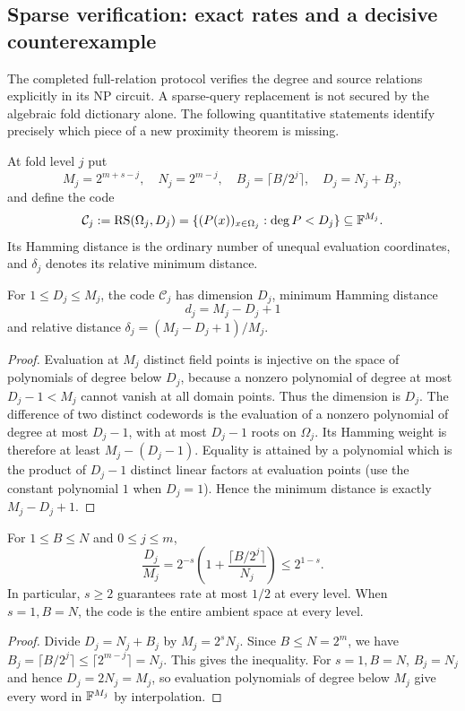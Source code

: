 \subsection{Sparse verification: exact rates and a decisive counterexample}\label{sec:security14:sparse}
The completed full-relation protocol verifies the
degree and source relations explicitly in its NP
circuit. A sparse-query replacement is not secured
by the algebraic fold dictionary alone. The
following quantitative statements identify precisely
which piece of a new proximity theorem is missing.

\begin{definition}\label{def:security14:codes}
At fold level $j$ put
\[
 M_j=2^{m+s-j},\quad
 N_j=2^{m-j},\quad
 B_j=\lceil B/2^j\rceil,\quad
 D_j=N_j+B_j,
\]
and define the code
\[
 \mathcal C_j:=
 \operatorname{RS}(\Omega_j,D_j)
 =\{(P(x))_{x\in\Omega_j}:
          \deg P<D_j\}
 \subseteq\mathbb{F}^{M_j}.
\]
Its Hamming distance is the
ordinary number of unequal
evaluation coordinates, and
$\delta_j$ denotes its
relative minimum distance.
\end{definition}

\begin{lemma}\label{lem:security14:rs-distance}
For $1\le D_j\le M_j$,
the code $\mathcal C_j$ has
dimension $D_j$, minimum
Hamming distance
\[
 \boxed{d_j=M_j-D_j+1}
\]
and relative distance
$\delta_j=(M_j-D_j+1)/M_j$.
\end{lemma}
\begin{proof}
Evaluation at $M_j$
distinct field points
is injective on the
space of polynomials of
degree below $D_j$,
because a nonzero polynomial
of degree at most
$D_j-1<M_j$ cannot vanish
at all domain points.
Thus the dimension is
$D_j$. The difference
of two distinct codewords
is the evaluation of a
nonzero polynomial of degree
at most $D_j-1$, with at most
$D_j-1$ roots on $\Omega_j$.
Its Hamming weight is
therefore at least
$M_j-(D_j-1)$.
Equality is attained by
a polynomial which is the
product of $D_j-1$ distinct
linear factors at evaluation
points (use the constant
polynomial $1$ when
$D_j=1$). Hence the
minimum distance is
exactly $M_j-D_j+1$.
\end{proof}

\begin{lemma}\label{lem:security14:rates}
For $1\le B\le N$ and
$0\le j\le m$,
\[
 \boxed{
 \frac{D_j}{M_j}
 =2^{-s}\left(
 1+\frac{\lceil B/2^j\rceil}{N_j}
 \right)\le2^{1-s}.}
\]
In particular, $s\ge2$
guarantees rate at most
$1/2$ at every level.
When $s=1,B=N$, the
code is the entire ambient
space at every level.
\end{lemma}
\begin{proof}
Divide $D_j=N_j+B_j$
by $M_j=2^sN_j$.
Since $B\le N=2^m$,
we have
$B_j=\lceil B/2^j\rceil
\le\lceil2^{m-j}\rceil=N_j$.
This gives the inequality.
For $s=1,B=N$,
$B_j=N_j$ and hence
$D_j=2N_j=M_j$,
so evaluation polynomials
of degree below $M_j$
give every word in
$\mathbb{F}^{M_j}$ by
interpolation.
\end{proof}

